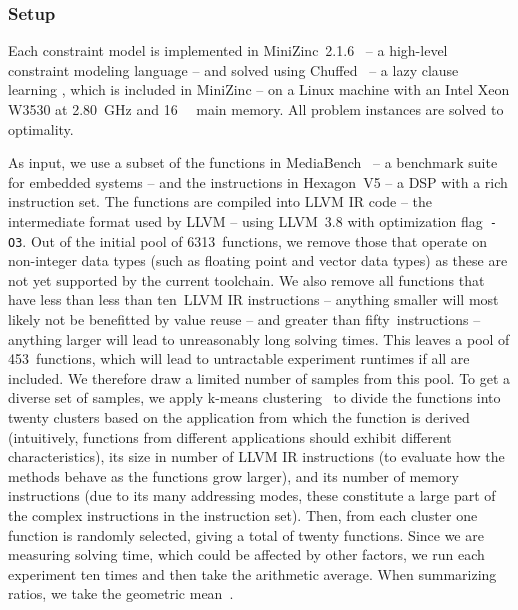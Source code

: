 \subsubsection{Setup}

Each \gls{constraint model} is implemented in \mbox{\gls{MiniZinc}
  2.1.6}~\cite{NethercoteEtAl:2007} -- a high-level \gls{constraint} modeling
language -- and solved using \gls{Chuffed}~\cite{Chu:2011} -- a \gls{lazy clause
  learning} , which is included in \gls{MiniZinc} --
on a Linux machine with an \gls{Intel} Xeon W3530 at \SI{2.80}{\GHz} and
\SI{16}{\giga\byte} main memory.
%
All problem instances are solved to optimality.

As input, we use a subset of the \glspl{function} in
\gls{MediaBench}~\cite{LeeEtAl:1997} -- a benchmark suite for embedded systems
-- and the \glspl{instruction} in \gls{Hexagon}~V5 -- a \gls{DSP} with a rich
\gls{instruction set}.
%
The \glspl{function} are compiled into \gls{LLVM} \gls{IR} code -- the
intermediate format used by \gls{LLVM} -- using \mbox{\gls{LLVM} 3.8} with
optimization flag~\texttt{-O3}.
%
Out of the initial pool of \num{6313}~\glspl{function}, we remove those that
operate on non-integer data types (such as floating point and vector data types)
as these are not yet supported by the current toolchain.
%
We also remove all \glspl{function} that have less than less than ten~\gls{LLVM}
\gls{IR} \glspl{instruction} -- anything smaller will most likely not be
benefitted by \gls{value reuse} -- and greater than fifty~\glspl{instruction} --
anything larger will lead to unreasonably long solving times.
%
This leaves a pool of \num{453}~\glspl{function}, which will lead to untractable
experiment runtimes if all are included.
%
We therefore draw a limited number of samples from this pool.
%
To get a diverse set of samples, we apply \gls{k-means
  clustering}~\cite{PhansalkarEtAl:2005} to divide the \glspl{function} into
twenty clusters based on the application from which the \gls{function} is
derived (intuitively, \glspl{function} from different applications should
exhibit different characteristics), its size in number of \gls{LLVM} \gls{IR}
\glspl{instruction} (to evaluate how the methods behave as the \glspl{function}
grow larger), and its number of memory \glspl{instruction} (due to its many
addressing modes, these constitute a large part of the complex
\glspl{instruction} in the \gls{instruction set}).
%
Then, from each cluster one \gls{function} is randomly selected, giving a total
of twenty \glspl{function}.
%
Since we are measuring solving time, which could be affected by other factors,
we run each experiment ten times and then take the arithmetic average.
%
When summarizing ratios, we take the geometric mean~\cite{FlemingWallace:1986}.


